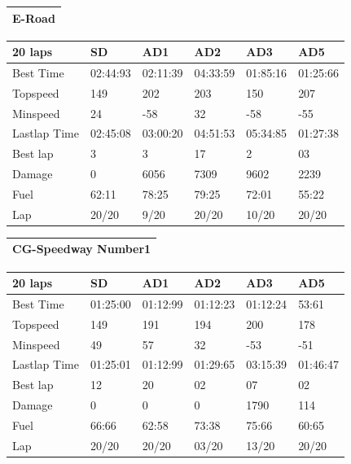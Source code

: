 \documentclass{llncs}
\begin{document}
\begin{table} [h!]
	
	\begin{tabular}{ |p{15.2cm}|}
		\hline
		\textbf{E-Road}   
		\\
		\hline
	\end{tabular}
	
	\begin{tabular}{ |p{3cm}|p{2cm}|p{2cm}|p{2 cm}|p{2 cm}|p{2 cm}|}
		\hline
		{ \color{blue}\textbf{20 laps} }&
		{ \color{red}\textbf{SD}}&  
		{ \color{red} \textbf{AD1} } &
		{ \color{red} \textbf{AD2} } &
		{ \color{red} \textbf{AD3} } &
		{ \color{red} \textbf{AD5} }
		\\
		\hline
		Best Time & 02:44:93  & 02:11:39 & 04:33:59 & 01:85:16 & 01:25:66 
		\\
		\hline
		Topspeed & 149  & 202 & 203 & 150 & 207 
		\\
		\hline
		Minspeed & 24  & -58 & 32& -58 & -55 
		\\
		\hline 
		
		Lastlap	Time  & 02:45:08 & 03:00:20 & 04:51:53 & 05:34:85  & 01:27:38 
		\\
		\hline 
		Best lap & 3 & 3 & 17 & 2& 03
		\\
		\hline
		Damage & 0 & 6056 & 7309 &9602  & 2239 
		\\
		\hline 
		Fuel & 62:11 & 78:25 & 79:25 &  72:01 & 55:22 
		\\
		\hline  
		Lap & 20/20 & 9/20 &20/20 & 10/20 & 20/20
		\\
		\hline
	\end{tabular}
	\begin{tabular}{ |p{15.2cm}|}
		\hline
		\textbf{CG-Speedway Number1}   
		\\
		\hline
	\end{tabular}
	\begin{tabular}{ |p{3cm}|p{2cm}|p{2cm}|p{2 cm}|p{2 cm}|p{2 cm}|}
		
		{ \color{blue}\textbf{20 laps} }&
		{ \color{red}\textbf{SD}}&  
		{ \color{red} \textbf{AD1} } &
		{ \color{red} \textbf{AD2} } &
		{ \color{red} \textbf{AD3} } &
		{ \color{red} \textbf{AD5} }
		\\
		\hline
		Best Time & 01:25:00  & 01:12:99 & 01:12:23& 01:12:24 & 53:61 
		\\
		\hline
		Topspeed & 149  & 191& 194 & 200 & 178 
		\\
		\hline
		Minspeed & 49 & 57 & 32 & -53 & -51 
		\\
		\hline 
		
		Lastlap	Time  & 01:25:01 & 01:12:99& 01:29:65 & 03:15:39 & 01:46:47 
		\\
		\hline 
		Best lap & 12 & 20 & 02 &07  & 02  
		\\
		\hline
		Damage & 0 & 0 & 0 & 1790 & 114 
		\\
		\hline 
		Fuel & 66:66 & 62:58 & 73:38 &75:66 & 60:65 
		\\
		\hline 
		Lap & 20/20 & 20/20 & 03/20 & 13/20 & 20/20
		\\
		\hline
	\end{tabular} 
	\label{Result1r}
\end{table}
\end{document}
